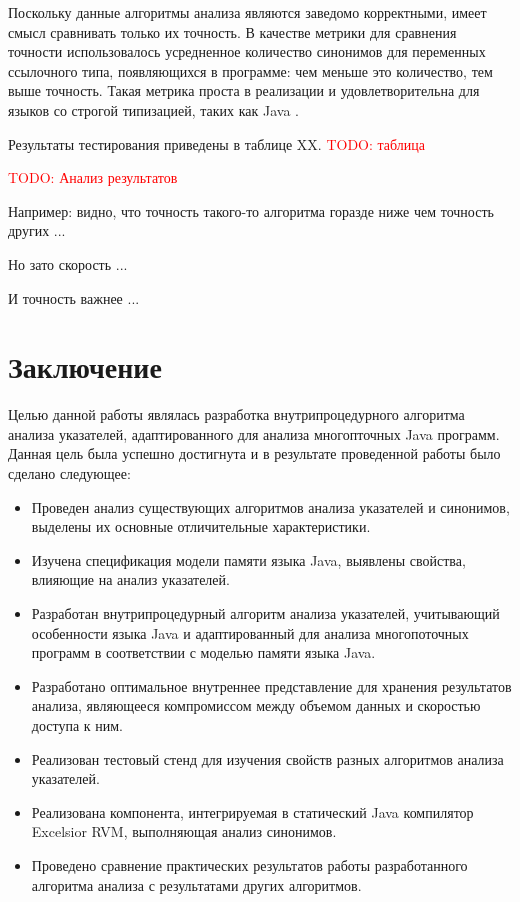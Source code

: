 \documentclass[14pt,titlepage]{extarticle}
\newcommand{\todo}[1]{\textcolor{red}{TODO: #1}}
\let\oldsection\section
\renewcommand{\section}{\newpage\oldsection}
\newcommand{\sectionwithoutnumber}[1]{
  \section*{#1}
  \addcontentsline{toc}{section}{#1}
}
\begin{document}
    Поскольку данные алгоритмы анализа являются заведомо корректными, имеет
    смысл сравнивать только их точность. В качестве метрики для сравнения
    точности использовалось усредненное количество синонимов для переменных
    ссылочного типа, появляющихся в программе: чем меньше это количество, тем
    выше точность. Такая метрика проста в реализации и удовлетворительна для
    языков со строгой типизацией, таких как Java
    \cite{hind_pointer_analysis_not_solved_yet}.

    Результаты тестирования приведены в таблице XX.
    \todo{таблица}

    \todo{Анализ результатов}

    Например: видно, что точность такого-то алгоритма горазде ниже чем точность
    других ...

    Но зато скорость ...

    И точность важнее ...

  \sectionwithoutnumber{Заключение}

    Целью данной работы являлась разработка внутрипроцедурного алгоритма
    анализа указателей, адаптированного для анализа многопточных Java программ.
    Данная цель была успешно достигнута и в результате проведенной работы было
    сделано следующее:
    \begin{itemize}
      \item Проведен анализ существующих алгоритмов анализа указателей и
            синонимов, выделены их основные отличительные характеристики.
      \item Изучена спецификация модели памяти языка Java, выявлены свойства,
            влияющие на анализ указателей.
      \item Разработан внутрипроцедурный алгоритм анализа указателей,
            учитывающий особенности языка Java и адаптированный для анализа
            многопоточных программ в соответствии с моделью памяти языка Java.
      \item Разработано оптимальное внутреннее представление для хранения
            результатов анализа, являющееся компромиссом между объемом данных
            и скоростью доступа к ним.
      \item Реализован тестовый стенд для изучения свойств разных алгоритмов
            анализа указателей.
      \item Реализована компонента, интегрируемая в статический Java компилятор
            Excelsior RVM, выполняющая анализ синонимов.
      \item Проведено сравнение практических результатов работы разработанного
            алгоритма анализа с результатами других алгоритмов.
    \end{itemize}
\end{document}
